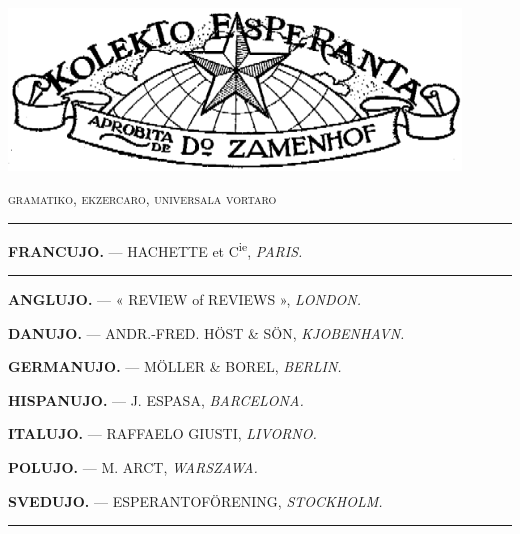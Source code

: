%
%
\begin{titlepage}

\begin{center}
\includegraphics[width=0.9\textwidth, angle=0]{../graphics/terglobo.png}\\[1em]

{}
\smallrule{}

\parbox{0.9\textwidth}{}

\vspace*{\fill}

{\csfont\textsc{gramatiko, ekzercaro, universala vortaro}}

\vspace*{\fill}

\rule{0.4\textwidth}{0.4pt}

\vspace*{\fill}


\csfont \footnotesize

\textbf{FRANCUJO.} — HACHETTE et C\textsuperscript{ie}, \textit{PARIS.}

\rule[0.9ex]{13mm}{0.4pt}

\textbf{ANGLUJO.} — « REVIEW of REVIEWS », \textit{LONDON.}

\textbf{DANUJO.} — ANDR.-FRED. HÖST \& SÖN, \textit{KJOBENHAVN.}

\textbf{GERMANUJO.} — MÖLLER \& BOREL, \textit{BERLIN.}

\textbf{HISPANUJO.} — J. ESPASA, \textit{BARCELONA.}

\textbf{ITALUJO.} — RAFFAELO GIUSTI, \textit{LIVORNO.}

\textbf{POLUJO.} — M. ARCT, \textit{WARSZAWA.}

\textbf{SVEDUJO.} — ESPERANTOFÖRENING, \textit{STOCKHOLM.}

\rule{5mm}{0.4pt}


\end{center}

\end{titlepage}
